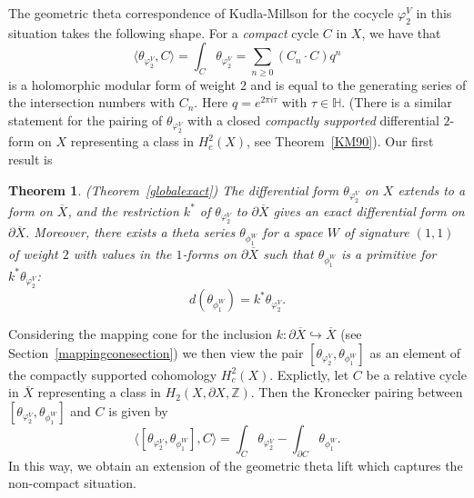 \documentclass[12pt,leqno]{amsart}
\numberwithin{equation}{section}
\theoremstyle{plain}
\newtheorem{theorem}{Theorem}[section]
\theoremstyle{definition}
\theoremstyle{remark}
\newcommand{\Z}{\mathbb{Z}}
\newcommand{\h}{\mathbb{H}}
\begin{document}
The geometric theta correspondence of Kudla-Millson \cite{KM90} for the cocycle $\varphi^V_{2}$ in this situation takes the following shape. For a {\it compact} cycle $C$ in $X$, we have that 
\begin{equation}\label{KM-id}
\langle \theta_{\varphi^V_{2}}, C \rangle =  \int_C  \theta_{\varphi^V_{2}}= \sum_{n \geq 0} (C_n \cdot C) q^n
\end{equation}
is a holomorphic modular form of weight $2$ and is equal to the generating series of the  intersection numbers with $C_n$. Here $q = e^{2\pi i \tau}$ with $\tau \in \h$. 
(There is a similar statement for the pairing of $\theta_{\varphi^V_{2}}$ with a closed {\it compactly supported} differential $2$-form on ${X}$ representing a class in $H^2_c(X)$, see Theorem~\ref{KM90}). Our first result is 

\begin{theorem}\label{FM-boundaryexact}  (Theorem~\ref{globalexact})
The differential form $\theta_{\varphi^V_{2}}$ on $X$ extends to a form on $\overline{X}$, and the restriction $k^{\ast}$ of $\theta_{\varphi^V_{2}}$ to $\partial \overline{X}$ gives an {\it exact} differential form on $\partial\overline{X}$. Moreover, there exists a theta series $\theta_{\phi_1^W}$ for a space $W$ of signature $(1,1)$  of weight $2$ with values in the $1$-forms on $\partial \overline{X}$ such that $\theta_{\phi_1^W}$ is a primitive for $k^{\ast} \theta_{\varphi^V_{2}}$:
\[
d (\theta_{\phi_1^W}) = k^{\ast} \theta_{\varphi^V_{2}}.
\]
\end{theorem}

Considering the mapping cone for the inclusion $k: \partial \overline{X} \hookrightarrow \overline{X}$ (see Section~\ref{mappingconesection}) we then view the pair $[\theta_{\varphi^V_{2}}, \theta_{\phi_1^W}]$ as an element of the compactly supported cohomology $H^2_c(X)$. Explictly, let $C$ be a relative cycle in $\overline{X}$ representing a class in $H_2({X},\partial {X},\Z)$. Then the Kronecker pairing between $[\theta_{\varphi^V_{2}}, \theta_{\phi_1^W}]$ and $C$ is given by
\begin{equation}\label{mappingconelift}
\langle [\theta_{\varphi^V_{2}}, \theta_{\phi_1^W}], C \rangle = \int_C  \theta_{\varphi^V_{2}}
 - \int_{\partial C} \theta_{\phi_1^W}.
\end{equation}
In this way, we obtain an extension of the geometric theta lift which captures the non-compact situation.
\end{document}
